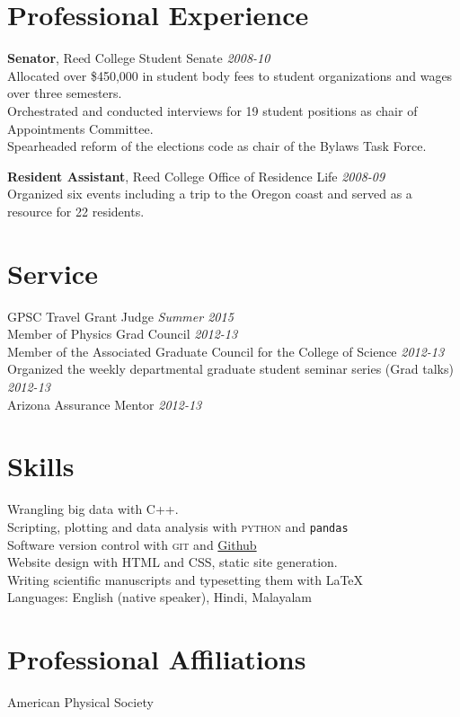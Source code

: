\documentclass[final,oneside,10pt]{memoir}
\begin{document}
\section*{Professional Experience}

 \textsf{\textbf{Senator}}, \textsf{ Reed College Student Senate}\hfill\textit{ 2008-10}\\
  Allocated over \$450,000 in student body fees to student organizations and wages over three semesters.\\
 Orchestrated and conducted interviews for 19 student positions as chair of Appointments Committee.\\
 Spearheaded reform of the elections code as chair of the Bylaws Task Force.

\textsf{\textbf{Resident Assistant}}, \textsf{ Reed College Office of Residence Life}\hfill \textit{ 2008-09}\\
 Organized six events including a trip to the Oregon coast and  served as a resource for 22 residents.
\section*{Service}

  GPSC Travel Grant Judge \hfill\emph{Summer 2015}\\
  Member of Physics Grad Council \hfill\emph{2012-13}\\
 Member of the Associated Graduate Council for the College of Science \hfill\emph{2012-13}\\
 Organized the weekly departmental graduate student seminar series (Grad talks) \hfill\emph{2012-13}\\
 Arizona Assurance Mentor \hfill\emph{2012-13}
\section*{Skills}
  Wrangling big data with C++.\\ 
  Scripting, plotting and data analysis with \textsc{python} and \texttt{pandas}\\ 
  Software version control with \textsc{git} and \href{http://www.github.com/adarshp}{Github}\\
  Website design with \textsc{HTML} and \textsc{CSS}, static site generation.\\ 
  Writing scientific manuscripts and typesetting them with \LaTeX\\ 
  Languages: English (native speaker), Hindi, Malayalam
\section*{Professional Affiliations}

 American Physical Society
\end{document}
